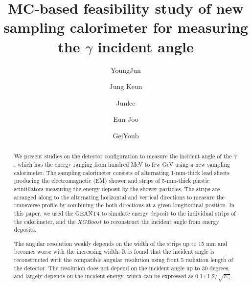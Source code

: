 \documentclass[jkps,preprint,fleqn,showpacs,showkeys]{revtex4}
\newcommand{\XGB}{XGBoost}
\begin{document}
\setcounter{page}{0}
\title[]{ MC-based feasibility study of new sampling calorimeter for measuring the $\gamma$ incident angle }

\author{YoungJun }
\author{Jung Keun }
\author{Junlee }
\author{Eun-Joo }
\author{GeiYoub  }


\begin{abstract}
We present studies on the detector configuration to measure the incident angle of the $\gamma$, which has the energy ranging from hundred MeV to few GeV using a new sampling calorimeter. The sampling calorimeter consists of alternating 1-mm-thick lead sheets producing the electromagnetic (EM) shower and strips of 5-mm-thick plastic scintillators measuring the energy deposit by the shower particles. The strips are arranged along to the alternating horizontal and vertical directions to measure the transverse profile by combining the both directions at a given longitudinal position. In this paper, we used the GEANT4 to simulate energy deposit to the individual strips of the calorimeter, and the $\XGB$ to reconstruct the incident angle from energy deposits. 

The angular resolution weakly depends on the width of the strips up to 15 mm and becomes worse with the increasing width. It is found that the incident angle is reconstructed with the compatible angular resolution using front 5 radiation length of the detector. The resolution does not depend on the incident angle up to 30 degrees, and largely depends on the incident energy, which can be expressed as 0.1+1.2$/ \sqrt{E_\gamma}$.

\end{abstract}

\maketitle
\end{document}
